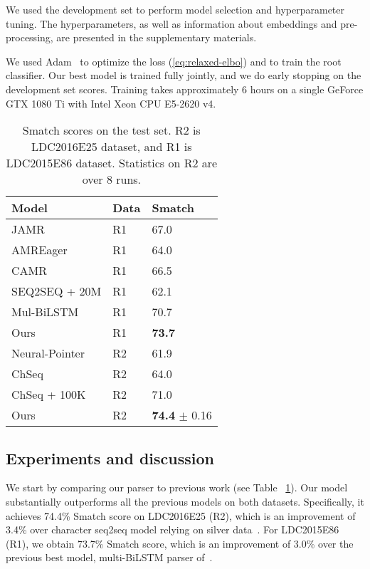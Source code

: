 \documentclass[11pt,a4paper]{article}
\begin{document}
 We used the development set to perform model selection and hyperparameter tuning. The hyperparameters, as well as  information about embeddings and pre-processing, are presented in the supplementary materials. 
 
We used Adam~\cite{Kingma2014AdamAM} to optimize the loss (\ref{eq:relaxed-elbo}) and to train the root classifier. 
Our best model is trained fully jointly, and
we do early stopping on the development set scores. Training takes approximately 6 hours on a single GeForce GTX 1080 Ti with Intel Xeon CPU E5-2620 v4.

\nocite{pytorch,nltk}
\begin{table}[t!]
    \begin{center} 
        \begin{tabular}{lll} 
            \hline  Model & Data & Smatch \\ \hline
            JAMR \tiny\cite{jamr-16} & R1& 67.0  \\
            AMREager \tiny\cite{Marco} & R1& 64.0  \\
            CAMR  \tiny\cite{camr_sem} & R1& 66.5  \\
            SEQ2SEQ + 20M  \tiny\cite{konstas-EtAl:2017:Long} & R1&  62.1\\
            Mul-BiLSTM \tiny\cite{foland-martin:2017:Long} & R1&  70.7\\
            Ours & R1&  \bf 73.7\\
            \hline
            Neural-Pointer \tiny\cite{neural-pointer-eval-16} & R2 & 61.9 \\
            ChSeq \tiny\cite{Character} & R2&   64.0\\
            ChSeq + 100K  \tiny\cite{Character} & R2&   71.0\\
            Ours & R2& {\bf74.4} \tiny $ \pm$ 0.16\\
            \hline
        \end{tabular}
    \end{center}
    \caption{\label{table:all_results}Smatch scores on the test set. R2 is LDC2016E25 dataset, and R1 is LDC2015E86 dataset. Statistics on R2 are over 8 runs.}
\end{table}

\subsection{Experiments and discussion}

We start by comparing our parser to previous work (see Table ~\ref{table:all_results}). Our model substantially outperforms all the previous models on both datasets. Specifically, it achieves 74.4\%  Smatch score on LDC2016E25 (R2), which is an improvement of 3.4\% over character seq2seq model relying on silver data~\cite{Character}. For LDC2015E86 (R1), we obtain 73.7\% Smatch score, which is an improvement of 3.0\% over  the previous best model,  multi-BiLSTM parser of~.
\end{document}
